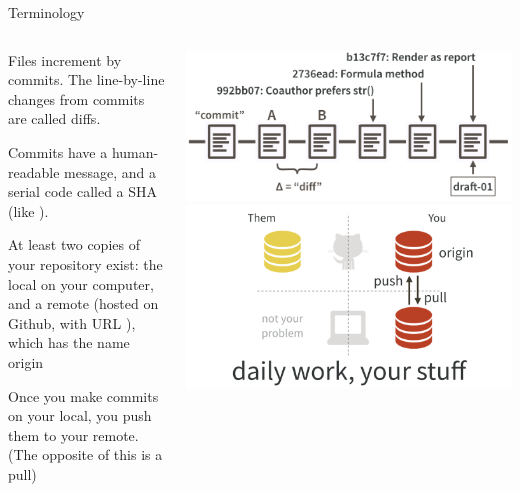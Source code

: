 \documentclass[ignorenonframetext,notes, 10pt, aspectratio=169]{beamer}
\begin{document}
\begin{frame}{Terminology}
\begin{columns}
\begin{column}{0.5\textwidth}
\begin{wideitemize}
\item<1-> Files increment by \alert{commit}s. The line-by-line changes from commits are called \alert{diffs}. 
\item<2-> Commits have a human-readable \alert{message}, and a serial code called a \alert{SHA} (like ).
\item<3-> At least two copies of your repository exist: the \alert{local} on your computer, and a \alert{remote} (hosted on Github, with URL ), \pause which has the name \alert{origin}
\item<4-> Once you make commits on your local, you \alert{push} them to your remote. (The opposite of this is a \alert{pull})
\end{wideitemize}
\end{column}
\begin{column}{0.5\textwidth}
\includegraphics[width = \linewidth]{commit-diff-sha-tag.png}
\includegraphics[width = \linewidth]{pull-push-yours.png}
\end{column}
\end{columns}
\end{frame}


\end{document}
